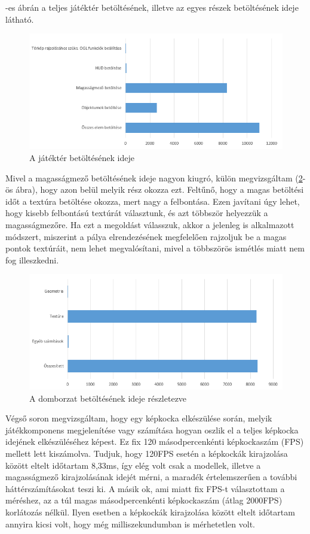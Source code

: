 -es ábrán a teljes játéktér betöltésének, illetve az egyes részek betöltésének ideje látható.

\begin{figure}[h]
\centering
\includegraphics[scale=0.84]{kepek/map_load_diag.png}
\caption{A játéktér betöltésének ideje}
\label{fig:map_diag}
\end{figure}

Mivel a magasságmező betöltésének ideje nagyon kiugró, külön megvizsgáltam (\ref{fig:height_map_diag}-ös ábra), hogy azon belül melyik rész okozza ezt. Feltűnő, hogy a magas betöltési időt a textúra betöltése okozza, mert nagy a felbontása. Ezen javítani úgy lehet, hogy kisebb felbontású textúrát választunk, és azt többször helyezzük a magasságmezőre. Ha ezt a megoldást válasszuk, akkor a jelenleg is alkalmazott módszert, miszerint a pálya elrendezésének megfelelően rajzoljuk be a magas pontok textúráit, nem lehet megvalósítani, mivel a többszörös ismétlés miatt nem fog illeszkedni.
 
\begin{figure}[h]
\centering
\includegraphics[scale=0.84]{kepek/height_map_load_diag.png}
\caption{A domborzat betöltésének ideje részletezve}
\label{fig:height_map_diag}
\end{figure}

\newpage
Végső soron megvizsgáltam, hogy egy képkocka elkészülése során, melyik játékkomponens megjelenítése vagy számítása hogyan oszlik el a teljes képkocka idejének elkészüléséhez képest. Ez fix 120 másodpercenkénti képkockaszám (FPS) mellett lett kiszámolva. Tudjuk, hogy 120FPS esetén a képkockák kirajzolása között eltelt időtartam 8,33ms, így elég volt csak a modellek, illetve a magasságmező kirajzolásának idejét mérni, a maradék értelemszerűen a további háttérszámításokat teszi ki.
A másik ok, ami miatt fix FPS-t választottam a méréshez, az a túl magas másodpercenkénti képkockaszám (átlag 2000FPS) korlátozás nélkül. Ilyen esetben a képkockák kirajzolása között eltelt időtartam annyira kicsi volt, hogy még milliszekundumban is mérhetetlen volt.

